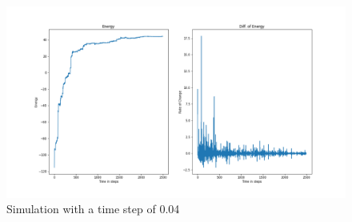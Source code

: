 \begin{figure}[!h]
	\begin{center}
		\includegraphics[scale= 0.35]{Figure/plot_04.png}
	\end{center}
	\caption[Simulation]{Simulation with a time step of 0.04 }
	\label{Plot04}
\end{figure}
